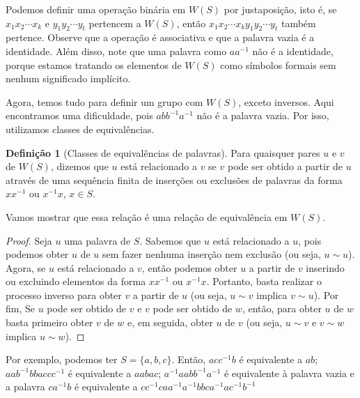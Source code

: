 \documentclass[a4paper,portuguese,11pt,twoside, leqno]{book}
\theoremstyle{definition}
\newtheorem{deff}{Definição}[section]
\begin{document}
	\par\vspace{0.3cm} Podemos definir uma operação binária em $W(S)$ por justaposição, isto é, se $x_1x_2\cdots x_k$ e $y_1y_2\cdots y_t$ pertencem a $W(S)$, então $x_1x_2\cdots x_ky_1y_2\cdots y_t$ também pertence. Observe que a operação é associativa e que a palavra vazia é a identidade. Além disso, note que uma palavra como $aa^{-1}$ não é a identidade, porque estamos tratando os elementos de $W(S)$ como símbolos formais sem nenhum significado implícito.
	
	\par\vspace{0.3cm} Agora, temos tudo para definir um grupo com $W(S)$, exceto inversos. Aqui encontramos uma dificuldade, pois $abb^{-1}a^{-1}$ não é a palavra vazia. Por isso, utilizamos classes de equivalências.
	
	\begin{deff}[Classes de equivalências de palavras]
		Para quaisquer pares $u$ e $v$ de $W(S)$, dizemos que $u$ está relacionado a $v$ se $v$ pode ser obtido a partir de $u$ através de uma sequência finita de inserções ou exclusões de palavras da forma $xx^{-1}$ ou $x^{-1}x$, $x\in S$.
	\end{deff}
	
	\par\vspace{0.3cm} Vamos mostrar que essa relação é uma relação de equivalência em $W(S)$.
	
	\begin{proof}
		Seja $u$ uma palavra de $S$. Sabemos que $u$ está relacionado a $u$, pois podemos obter $u$ de $u$ sem fazer nenhuma inserção nem exclusão (ou seja, $u\sim u$). Agora, se $u$ está relacionado a $v$, então podemos obter $u$ a partir de $v$ inserindo ou excluindo elementos da forma $xx^{-1}$ ou $x^{-1}x$. Portanto, basta realizar o processo inverso para obter $v$ a partir de $u$ (ou seja, $u\sim v$ implica $v\sim u$). Por fim, Se $u$ pode ser obtido de $v$ e $v$ pode ser obtido de $w$, então, para obter $u$ de $w$ basta primeiro obter $v$ de $w$ e, em seguida, obter $u$ de $v$ (ou seja, $u\sim v$ e $v\sim w$ implica $u\sim w$).
	\end{proof}
	
	\par\vspace{0.3cm} Por exemplo, podemos ter $S = \{a, b, c\}$. Então, $acc^{-1}b$ é equivalente  a $ab$; $aab^{-1}bbaccc^{-1}$ é equivalente a $aabac$; $a^{-1}aabb^{-1}a^{-1}$ é equivalente à palavra vazia e a palavra $ca^{-1}b$ é equivalente a $cc^{-1}caa^{-1}a^{-1}bbca^{-1}ac^{-1}b^{-1}$
	
\end{document}
